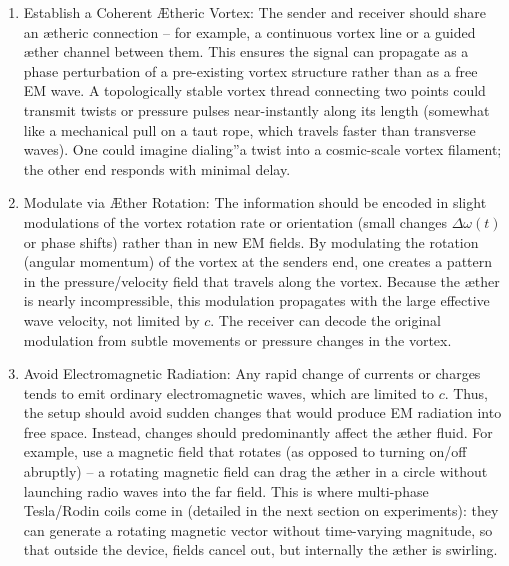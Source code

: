 \begin{enumerate}

\item 
Establish a Coherent Ætheric Vortex: The sender and receiver should share an ætheric connection – for example, a continuous vortex line or a guided æther channel between them. This ensures the signal can propagate as a phase perturbation of a pre-existing vortex structure rather than as a free EM wave. A topologically stable vortex thread connecting two points could transmit twists or pressure pulses near-instantly along its length (somewhat like a mechanical pull on a taut rope, which travels faster than transverse waves). One could imagine \grqq dialing\textquotedblright a twist into a cosmic-scale vortex filament; the other end responds with minimal delay.




\item 
Modulate via Æther Rotation: The information should be encoded in slight modulations of the vortex rotation rate or orientation (small changes $\Delta \omega(t)$ or phase shifts) rather than in new EM fields. By modulating the rotation (angular momentum) of the vortex at the sender\rqs s end, one creates a pattern in the pressure/velocity field that travels along the vortex. Because the æther is nearly incompressible, this modulation propagates with the large effective wave velocity, not limited by $c$. The receiver can decode the original modulation from subtle movements or pressure changes in the vortex.




\item 
Avoid Electromagnetic Radiation: Any rapid change of currents or charges tends to emit ordinary electromagnetic waves, which are limited to $c$. Thus, the setup should avoid sudden changes that would produce EM radiation into free space. Instead, changes should predominantly affect the æther fluid. For example, use a magnetic field that rotates (as opposed to turning on/off abruptly) – a rotating magnetic field can drag the æther in a circle without launching radio waves into the far field. This is where multi-phase Tesla/Rodin coils come in (detailed in the next section on experiments): they can generate a rotating magnetic vector without time-varying magnitude, so that outside the device, fields cancel out, but internally the æther is swirling.





\end{enumerate}
